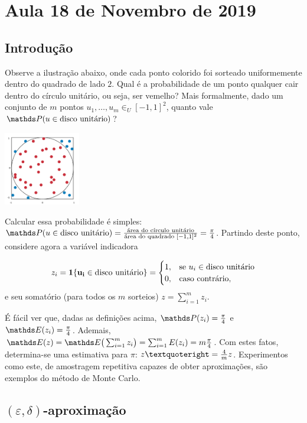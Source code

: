 \section{Aula 18 de Novembro de 2019}
\label{2019_11_18}

\subsection{Introdução}

Observe a ilustração abaixo, onde cada ponto colorido foi sorteado uniformemente dentro do quadrado de lado $2$. Qual é a probabilidade de um ponto qualquer cair dentro do círculo unitário, ou seja, ser vemelho? Mais formalmente, dado um conjunto de $m$ pontos $u_1, \dots, u_m \in_U [-1,1]^2$, quanto vale $\PP(u \in \text{disco unitário})$?

\includegraphics[width=0.25\textwidth]{aulas/11_18/PiBoard.png}

Calcular essa probabilidade é simples: $\PP(u \in \text{disco unitário}) = {\text{área do círculo unitário} \over \text{área do quadrado } [-1,1]^2} = {\pi \over 4}$. Partindo deste ponto, considere agora a variável indicadora

$$
z_i = \mathbbm{1}\{u_i \in \text{disco unitário}\} = 
\begin{cases}
    1, & \text{se } u_i \in \text{disco unitário} \\
    0, & \text{caso contrário},
\end{cases}
$$ e seu somatório (para todos os $m$ sorteios) $z = \sum_{i = 1}^m z_i$.

É fácil ver que, dadas as definições acima, $\PP(z_i) = {\pi \over 4}$ e $\EE(z_i) = {\pi \over 4}$. Ademais, $\EE(z) = \EE\big(\sum_{i = 1}^m z_i\big) = \sum_{i = 1}^m E(z_i) = m {\pi \over 4}$. Com estes fatos, determina-se uma estimativa para $\pi$: $z’ = {4 \over m} z$. Experimentos como este, de amostragem repetitiva capazes de obter aproximações, são exemplos do método de Monte Carlo.

\subsection{$(\varepsilon, \delta)$-aproximação}


